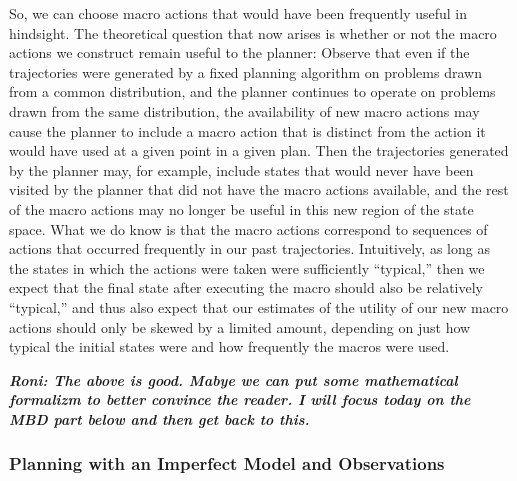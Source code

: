 \documentclass[12pt]{article}
\newcommand{\note}[1]{\textbf{\textit{#1}}}
\begin{document}
So, we can choose macro actions that would have been frequently useful in hindsight. The theoretical question that now arises is whether or not the macro actions we construct remain useful to the planner: Observe that even if the trajectories were generated by a fixed planning algorithm on problems drawn from a common distribution, and the planner continues to operate on problems drawn from the same distribution, the availability of new macro actions may cause the planner to include a macro action that is distinct from the action it would have used at a given point in a given plan. Then the trajectories generated by the planner may, for example, include states that would never have been visited by the planner that did not have the macro actions available, and the rest of the macro actions may no longer be useful in this new region of the state space. What we do know is that the macro actions correspond to sequences of actions that occurred frequently in our past trajectories. Intuitively, as long as the states in which the actions were taken were sufficiently ``typical,'' then we expect that the final state after executing the macro should also be relatively ``typical,'' and thus also expect that our estimates of the utility of our new macro actions should only be skewed by a limited amount, depending on just how typical the initial states were and how frequently the macros were used.


\note{Roni: The above is good. Mabye we can put some mathematical formalizm to better convince the reader. I will focus today on the MBD part below and then get back to this.}





\subsubsection{Planning with an Imperfect Model and Observations}
\end{document}
